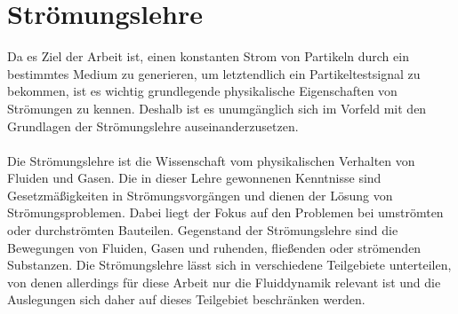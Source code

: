 \section{Str\"{o}mungslehre}
Da es Ziel der Arbeit ist, einen konstanten Strom von Partikeln durch ein bestimmtes Medium zu generieren, um letztendlich ein Partikeltestsignal zu bekommen, ist es wichtig grundlegende physikalische Eigenschaften von Str\"{o}mungen zu kennen. Deshalb ist es unumg\"{a}nglich sich im Vorfeld mit den Grundlagen der Str\"{o}mungslehre auseinanderzusetzen.
\\\\
Die Str\"{o}mungslehre ist die Wissenschaft vom physikalischen Verhalten von Fluiden und Gasen. Die in dieser Lehre gewonnenen Kenntnisse sind Gesetzm\"{a}{\ss}igkeiten in Str\"{o}mungsvorg\"{a}ngen und dienen der L\"{o}sung von Str\"{o}mungsproblemen. Dabei liegt der Fokus auf den Problemen bei umstr\"{o}mten oder durchstr\"{o}mten Bauteilen. Gegenstand der Str\"{o}mungslehre sind die Bewegungen von Fluiden, Gasen und ruhenden, flie{\ss}enden oder str\"{o}menden Substanzen. Die Str\"{o}mungslehre l\"{a}sst sich in verschiedene Teilgebiete unterteilen, von denen allerdings f\"{u}r diese Arbeit nur die Fluiddynamik relevant ist und die Auslegungen sich daher auf dieses Teilgebiet beschr\"{a}nken werden\cite{stream}.

